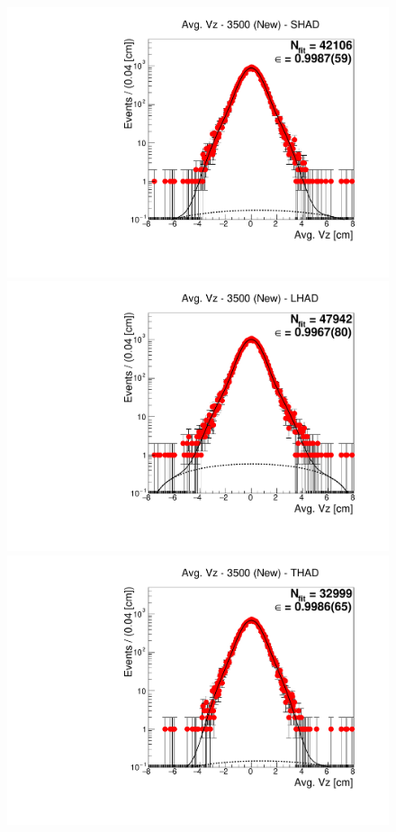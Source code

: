 \begin{figure}[H]
\centering
\includegraphics[scale=0.25]{figures/plots/nonDDbar_fit_results/3650_new/fit_new_3500_data_SHAD.pdf}
\hspace{-0.5cm}
\includegraphics[scale=0.25]{figures/plots/nonDDbar_fit_results/3650_new/fit_new_3500_data_LHAD.pdf}
\hspace{-0.5cm}
\includegraphics[scale=0.25]{figures/plots/nonDDbar_fit_results/3650_new/fit_new_3500_data_THAD.pdf}

\end{figure}
